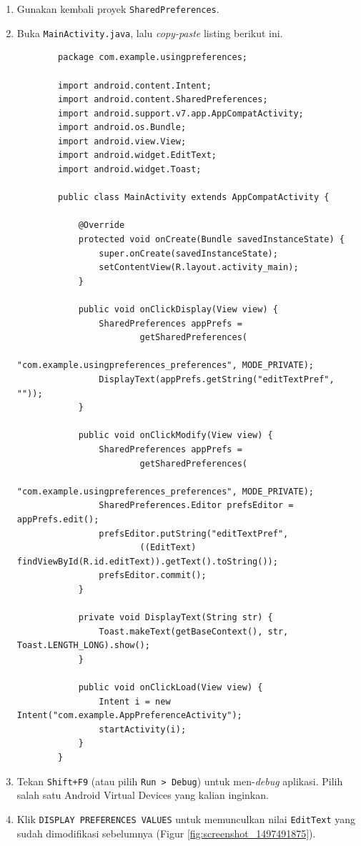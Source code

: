 \documentclass{scrartcl}
\begin{document}
	\begin{enumerate}
		\item Gunakan kembali proyek \texttt{SharedPreferences}.
		\item Buka \texttt{MainActivity.java}, lalu \textit{copy-paste} listing berikut ini.
		
		\begin{verbatim}
		package com.example.usingpreferences;
		
		import android.content.Intent;
		import android.content.SharedPreferences;
		import android.support.v7.app.AppCompatActivity;
		import android.os.Bundle;
		import android.view.View;
		import android.widget.EditText;
		import android.widget.Toast;
		
		public class MainActivity extends AppCompatActivity {
		
			@Override
			protected void onCreate(Bundle savedInstanceState) {
				super.onCreate(savedInstanceState);
				setContentView(R.layout.activity_main);
			}
			
			public void onClickDisplay(View view) {
				SharedPreferences appPrefs =
						getSharedPreferences(
								"com.example.usingpreferences_preferences", MODE_PRIVATE);
				DisplayText(appPrefs.getString("editTextPref", ""));
			}
			
			public void onClickModify(View view) {
				SharedPreferences appPrefs =
						getSharedPreferences(
								"com.example.usingpreferences_preferences", MODE_PRIVATE);
				SharedPreferences.Editor prefsEditor = appPrefs.edit();
				prefsEditor.putString("editTextPref",
						((EditText) findViewById(R.id.editText)).getText().toString());
				prefsEditor.commit();
			}
			
			private void DisplayText(String str) {
				Toast.makeText(getBaseContext(), str, Toast.LENGTH_LONG).show();
			}
			
			public void onClickLoad(View view) {
				Intent i = new Intent("com.example.AppPreferenceActivity");
				startActivity(i);
			}
		}
		\end{verbatim}
		
		\item Tekan \texttt{Shift+F9} (atau pilih \texttt{Run > Debug}) untuk men-\textit{debug} aplikasi. Pilih salah satu Android Virtual Devices yang kalian inginkan.
		
		\item Klik \texttt{DISPLAY PREFERENCES VALUES} untuk memunculkan nilai \texttt{EditText} yang sudah dimodifikasi sebelumnya (Figur \ref{fig:screenshot_1497491875}).
		

\end{enumerate}
\end{document}
